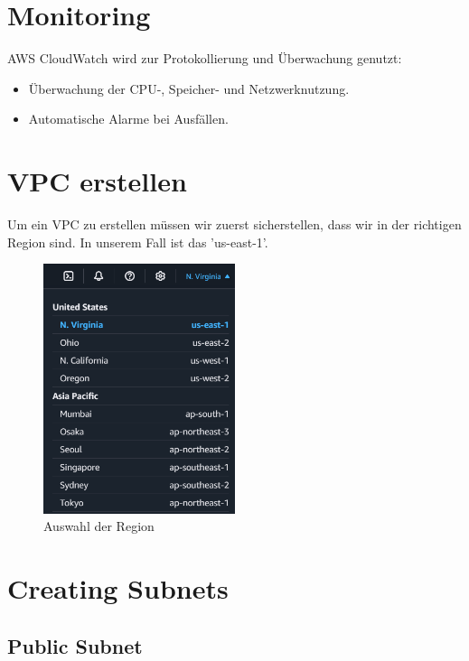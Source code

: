 \documentclass[a4paper,12pt]{article}
\begin{document}
\section{Monitoring}
AWS CloudWatch wird zur Protokollierung und Überwachung genutzt:
\begin{itemize}
	\item Überwachung der CPU-, Speicher- und Netzwerknutzung.
	\item Automatische Alarme bei Ausfällen.
\end{itemize}

\section{VPC erstellen}

Um ein VPC zu erstellen müssen wir zuerst sicherstellen, dass wir in der richtigen Region sind. 
In unserem Fall ist das 'us-east-1'. 
\begin{figure}[H]
	\centering
	\includegraphics[width=0.5\textwidth]{data/Choose_Region.png}
	\caption{Auswahl der Region}
	\label{fig:Auswahl der Region}
\end{figure}

\section{Creating Subnets}
\subsection{Public Subnet}
\end{document}
